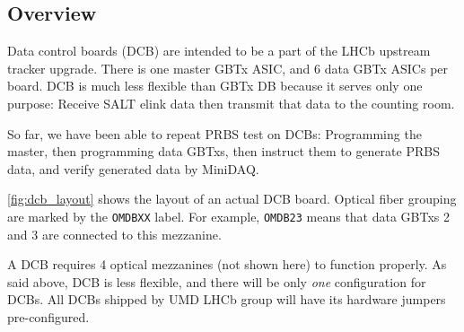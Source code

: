 \subsection{Overview}
Data control boards (DCB) are intended to be a part of the LHCb upstream tracker
upgrade.
There is one master GBTx ASIC, and 6 data GBTx ASICs per board.
DCB is much less flexible than GBTx DB because it serves only one purpose:
Receive SALT elink data then transmit that data to the counting room.

So far, we have been able to repeat PRBS test on DCBs:
Programming the master, then programming data GBTxs, then instruct them to
generate PRBS data, and verify generated data by MiniDAQ.

\autoref{fig:dcb_layout} shows the layout of an actual DCB board.
Optical fiber grouping are marked by the \texttt{OMDBXX} label. For example,
\texttt{OMDB23} means that data GBTxs 2 and 3 are connected to this mezzanine.

A DCB requires 4 optical mezzanines (not shown here) to function properly.
As said above, DCB is less flexible, and there will be only \emph{one}
configuration for DCBs.
All DCBs shipped by UMD LHCb group will have its hardware jumpers
pre-configured.

